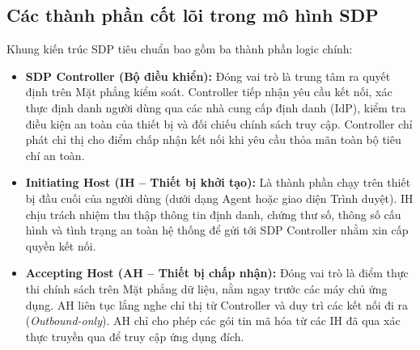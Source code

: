 \subsection{Các thành phần cốt lõi trong mô hình SDP}
\label{subsec:3_1_3}

Khung kiến trúc SDP tiêu chuẩn bao gồm ba thành phần logic chính:

\begin{itemize}
    \item \textbf{SDP Controller (Bộ điều khiển):} Đóng vai trò là trung tâm ra quyết định trên Mặt phẳng kiểm soát. Controller tiếp nhận yêu cầu kết nối, xác thực định danh người dùng qua các nhà cung cấp định danh (IdP), kiểm tra điều kiện an toàn của thiết bị và đối chiếu chính sách truy cập. Controller chỉ phát chỉ thị cho điểm chấp nhận kết nối khi yêu cầu thỏa mãn toàn bộ tiêu chí an toàn.
    \item \textbf{Initiating Host (IH -- Thiết bị khởi tạo):} Là thành phần chạy trên thiết bị đầu cuối của người dùng (dưới dạng Agent hoặc giao diện Trình duyệt). IH chịu trách nhiệm thu thập thông tin định danh, chứng thư số, thông số cấu hình và tình trạng an toàn hệ thống để gửi tới SDP Controller nhằm xin cấp quyền kết nối.
    \item \textbf{Accepting Host (AH -- Thiết bị chấp nhận):} Đóng vai trò là điểm thực thi chính sách trên Mặt phẳng dữ liệu, nằm ngay trước các máy chủ ứng dụng. AH liên tục lắng nghe chỉ thị từ Controller và duy trì các kết nối đi ra (\textit{Outbound-only}). AH chỉ cho phép các gói tin mã hóa từ các IH đã qua xác thực truyền qua để truy cập ứng dụng đích.
\end{itemize}

